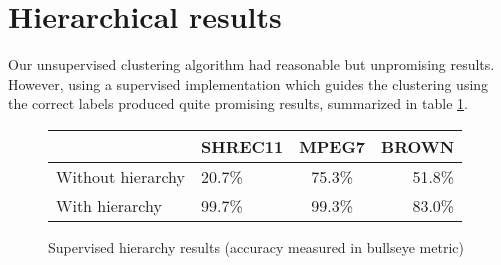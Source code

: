 \documentclass[../tech_report_1.tex]{subfiles}
\begin{document}

\section{Hierarchical results}

Our unsupervised clustering algorithm had reasonable but unpromising results. However, using a supervised implementation which guides the clustering using the correct labels produced quite promising results, summarized in table \ref{fig:supervised_hierarchy}.

\begin{figure}[ht]
\caption{Supervised hierarchy results (accuracy measured in bullseye metric)\label{fig:supervised_hierarchy}}
\centering
\begin{tabular}{ l | l c r }
	 & SHREC11 & MPEG7 & BROWN \\
	\hline
	Without hierarchy & 20.7\% & 75.3\% & 51.8\% \\
	With hierarchy & 99.7\% & 99.3\% & 83.0\% \\
\end{tabular}
\end{figure}
\end{document}
